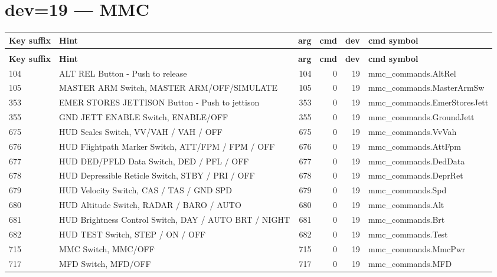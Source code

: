 \documentclass[10pt,a4paper]{article}
\begin{document}
\section{dev=19 — MMC}
\begin{longtable}{>{\ttfamily\small}p{38mm} >{\small}p{72mm} r r r >{\ttfamily\small}p{48mm}}
\toprule
\textbf{Key suffix} & \textbf{Hint} & \textbf{arg} & \textbf{cmd} & \textbf{dev} & \textbf{cmd symbol} \\
\midrule
\endfirsthead
\multicolumn{6}{l}{\small\itshape continued\ldots}\\
\toprule
\textbf{Key suffix} & \textbf{Hint} & \textbf{arg} & \textbf{cmd} & \textbf{dev} & \textbf{cmd symbol} \\
\midrule
\endhead
\bottomrule
\endfoot
\rowcolor{rowodd}
  104 & ALT REL Button - Push to release & 104 & 0 & 19 & mmc\_commands.AltRel \\
  105 & MASTER ARM Switch, MASTER ARM/OFF/SIMULATE & 105 & 0 & 19 & mmc\_commands.MasterArmSw \\
\rowcolor{rowodd}
  353 & EMER STORES JETTISON Button - Push to jettison & 353 & 0 & 19 & mmc\_commands.EmerStoresJett \\
  355 & GND JETT ENABLE Switch, ENABLE/OFF & 355 & 0 & 19 & mmc\_commands.GroundJett \\
\rowcolor{rowodd}
  675 & HUD Scales Switch, VV/VAH / VAH / OFF & 675 & 0 & 19 & mmc\_commands.VvVah \\
  676 & HUD Flightpath Marker Switch, ATT/FPM / FPM / OFF & 676 & 0 & 19 & mmc\_commands.AttFpm \\
\rowcolor{rowodd}
  677 & HUD DED/PFLD Data Switch, DED / PFL / OFF & 677 & 0 & 19 & mmc\_commands.DedData \\
  678 & HUD Depressible Reticle Switch, STBY / PRI / OFF & 678 & 0 & 19 & mmc\_commands.DeprRet \\
\rowcolor{rowodd}
  679 & HUD Velocity Switch, CAS / TAS / GND SPD & 679 & 0 & 19 & mmc\_commands.Spd \\
  680 & HUD Altitude Switch, RADAR / BARO / AUTO & 680 & 0 & 19 & mmc\_commands.Alt \\
\rowcolor{rowodd}
  681 & HUD Brightness Control Switch, DAY / AUTO BRT / NIGHT & 681 & 0 & 19 & mmc\_commands.Brt \\
  682 & HUD TEST Switch, STEP / ON / OFF & 682 & 0 & 19 & mmc\_commands.Test \\
\rowcolor{rowodd}
  715 & MMC Switch, MMC/OFF & 715 & 0 & 19 & mmc\_commands.MmcPwr \\
  717 & MFD Switch, MFD/OFF & 717 & 0 & 19 & mmc\_commands.MFD \\
\end{longtable}
\end{document}
